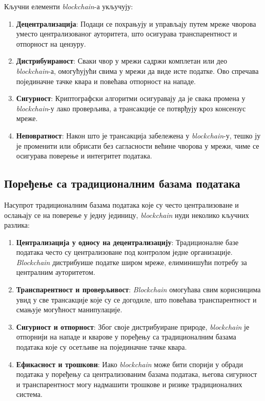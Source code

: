 \documentclass[12pt, a4paper]{article}
\begin{document}
Кључни елементи \textit{blockchain}-а укључују:
\begin{enumerate}
    \item \textbf{Децентрализација}: Подаци се похрањују и управљају путем мреже чворова уместо централизованог ауторитета, што осигурава транспарентност и отпорност на цензуру.
    \item  \textbf{Дистрибуираност}: Сваки чвор у мрежи садржи комплетан или део \textit{blockchain}-а, омогућујући свима у мрежи да виде исте податке. Ово спречава појединачне тачке квара и повећава отпорност на нападе.
    \item \textbf{Сигурност}: Криптографски алгоритми осигуравају да је свака промена у \textit{blockchain}-у лако проверљива, а трансакције се потврђују кроз консензус мреже.
    \item \textbf{Неповратност}: Након што је трансакција забележена у \textit{blockchain}-у, тешко ју је променити или обрисати без сагласности већине чворова у мрежи, чиме се осигурава поверење и интегритет података.
\end{enumerate}


\subsection{Поређење са традиционалним базама података}
Насупрот традиционалним базама података које су често централизоване и ослањају се на поверење у једну јединицу, \textit{blockchain} нуди неколико кључних разлика:
\begin{enumerate}
    \item \textbf{Централизација у односу на децентрализацију}: Традиционалне базе података често су централизоване под контролом једне организације. \textit{Blockchain} дистрибуише податке широм мреже, елиминишући потребу за централним ауторитетом.
    \item \textbf{Транспарентност и проверљивост}: \textit{Blockchain} омогућава свим корисницима увид у све трансакције које су се догодиле, што повећава транспарентност и смањује могућност манипулације.
    \item \textbf{Сигурност и отпорност}: Због своје дистрибуиране природе, \textit{blockchain} је отпорнији на нападе и кварове у поређењу са традиционалним базама података које су осетљиве на појединачне тачке квара.
    \item \textbf{Ефикасност и трошкови}: Иако \textit{blockchain} може бити спорији у обради података у поређењу са централизованим базама података, његова сигурност и транспарентност могу надмашити трошкове и ризике традиционалних система.
\end{enumerate}
\end{document}
